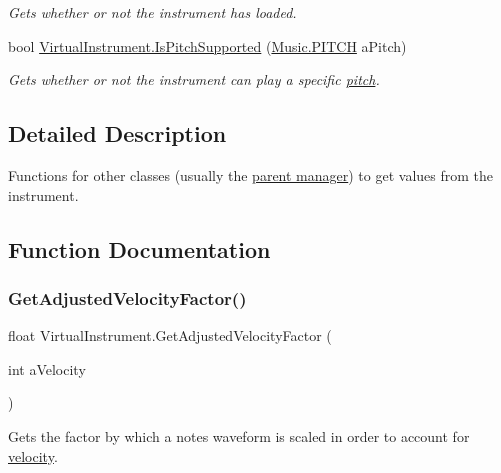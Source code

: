 \begin{DoxyCompactItemize}
\begin{DoxyCompactList}\small\item\em Gets whether or not the instrument has loaded. \end{DoxyCompactList}\item 
bool \hyperlink{group___v_i_base_pub_func_ga89655451c108a7ad5cb96ab308e33937}{Virtual\+Instrument.\+Is\+Pitch\+Supported} (\hyperlink{group___music_enums_ga508f69b199ea518f935486c990edac1d}{Music.\+P\+I\+T\+CH} a\+Pitch)
\begin{DoxyCompactList}\small\item\em Gets whether or not the instrument can play a specific \hyperlink{group___music_enums_ga508f69b199ea518f935486c990edac1d}{pitch}. \end{DoxyCompactList}\end{DoxyCompactItemize}


\subsection{Detailed Description}
Functions for other classes (usually the \hyperlink{group___v_i_m}{parent manager}) to get values from the instrument. 

\subsection{Function Documentation}
\mbox{\label{group___v_i_base_pub_func_gae638c68bd0e79d0b99495be69e50f49d}} 
\subsubsection{\texorpdfstring{Get\+Adjusted\+Velocity\+Factor()}{GetAdjustedVelocityFactor()}}
{\footnotesize\ttfamily float Virtual\+Instrument.\+Get\+Adjusted\+Velocity\+Factor (\begin{DoxyParamCaption}\item[{int}]{a\+Velocity }\end{DoxyParamCaption})}



Gets the factor by which a note\textquotesingle{}s waveform is scaled in order to account for \hyperlink{group___audio_DefVel}{velocity}. 



